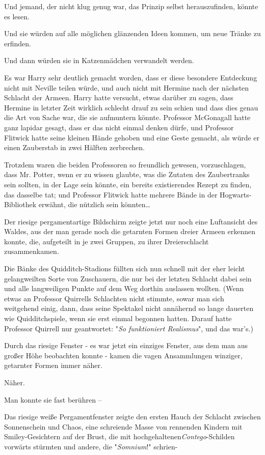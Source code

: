 {Und jemand, der nicht klug genug war, das Prinzip selbst herauszufinden, könnte es lesen.

Und sie würden auf alle möglichen glänzenden Ideen kommen, um neue Tränke zu erfinden.

Und dann würden sie in Katzenmädchen verwandelt werden.

Es war Harry sehr deutlich gemacht worden, dass er diese besondere Entdeckung nicht mit Neville teilen würde, und auch nicht mit Hermine nach der nächsten Schlacht der Armeen. Harry hatte versucht, etwas darüber zu sagen, dass Hermine in letzter Zeit wirklich schlecht drauf zu sein schien und dass dies genau die Art von Sache war, die sie aufmuntern könnte. Professor McGonagall hatte ganz lapidar gesagt, dass er das nicht einmal denken dürfe, und Professor Flitwick hatte seine kleinen Hände gehoben und eine Geste gemacht, als würde er einen Zauberstab in zwei Hälften zerbrechen.

Trotzdem waren die beiden Professoren so freundlich gewesen, vorzuschlagen, dass Mr. Potter, wenn er zu wissen glaubte, was die Zutaten des Zaubertranks sein sollten, in der Lage sein könnte, ein bereits existierendes Rezept zu finden, das dasselbe tat; und Professor Flitwick hatte mehrere Bände in der Hogwarts-Bibliothek erwähnt, die nützlich sein könnten…

Der riesige pergamentartige Bildschirm zeigte jetzt nur noch eine Luftansicht des Waldes, aus der man gerade noch die getarnten Formen dreier Armeen erkennen konnte, die, aufgeteilt in je zwei Gruppen, zu ihrer Dreierschlacht zusammenkamen.

Die Bänke des Quidditch-Stadions füllten sich nun schnell mit der eher leicht gelangweilten Sorte von Zuschauern, die nur bei der letzten Schlacht dabei sein und alle langweiligen Punkte auf dem Weg dorthin auslassen wollten. (Wenn etwas an Professor Quirrells Schlachten nicht stimmte, sowar man sich weitgehend einig, dann, dass seine Spektakel nicht annähernd so lange dauerten wie Quidditchspiele, wenn sie erst einmal begonnen hatten. Darauf hatte Professor Quirrell nur geantwortet: "\emph{So funktioniert Realismus}", und das war's.)

Durch das riesige Fenster - es war jetzt ein einziges Fenster, aus dem man aus großer Höhe beobachten konnte - kamen die vagen Ansammlungen winziger, getarnter Formen immer näher.

Näher.

Man konnte sie fast berühren --

Das riesige weiße Pergamentfenster zeigte den ersten Hauch der Schlacht zwischen Sonnenschein und Chaos, eine schreiende Masse von rennenden Kindern mit Smiley-Gesichtern auf der Brust, die mit hochgehaltenen\emph{Contego}-Schilden vorwärts stürmten und andere, die "\emph{Somnium}!" schrien-

}
